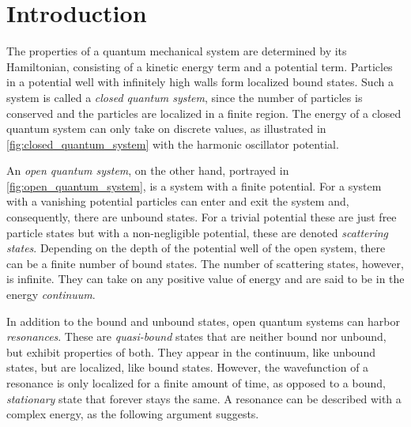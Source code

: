 \documentclass[../main/report.tex]{subfiles}
\begin{document}
\chapter{Introduction}
\label{cha:introduction}

The properties of a quantum mechanical system are determined by its Hamiltonian, consisting of a kinetic energy term and a potential term.
Particles in a potential well with infinitely high walls form localized bound states.
Such a system is called a \emph{closed quantum system}, since the number of particles is conserved and the particles are localized in a finite region. 
The energy of a closed quantum system can only take on discrete values, as illustrated in \cref{fig:closed_quantum_system} with the harmonic oscillator potential.

An \emph{open quantum system}, on the other hand, portrayed in \cref{fig:open_quantum_system}, is a system with a finite potential.
For a system with a vanishing potential particles can enter and exit the system and, consequently, there are unbound states. 
For a trivial potential these are just free particle states but with a non-negligible potential, these are denoted \emph{scattering states}.
Depending on the depth of the potential well of the open system, there can be a finite number of bound states.
The number of scattering states, however, is infinite. They can take on any positive value of energy and are said to be in the energy \emph{continuum}.

In addition to the bound and unbound states, open quantum systems can harbor \emph{resonances}. 
These are \emph{quasi-bound} states that are neither bound nor unbound, but exhibit properties of both. 
They appear in the continuum, like unbound states, but are localized, like bound states.
However, the wavefunction of a resonance is only localized for a finite amount of time, as opposed to a bound, \emph{stationary} state that forever stays the same.
A resonance can be described with a complex energy, as the following argument suggests.
\end{document}

